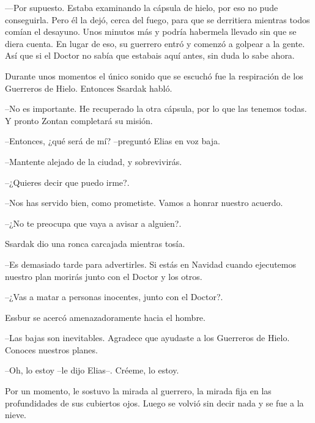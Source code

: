 —Por supuesto. Estaba examinando la cápsula de hielo, por eso no pude conseguirla. Pero él la dejó, cerca del fuego, para que se derritiera mientras todos comían el desayuno. Unos minutos más y podría habermela llevado sin que se diera cuenta. En lugar de eso, su guerrero entró y comenzó a golpear a la gente. Así que si el Doctor no sabía que estabais aquí antes, sin duda lo sabe ahora.



Durante unos momentos el único sonido que se escuchó fue la respiración de los Guerreros de Hielo. Entonces Ssardak habló.


--No es importante. He recuperado la otra cápsula, por lo que las tenemos todas. Y pronto Zontan completará su misión.



--Entonces, ¿qué será de mí? --preguntó Elias en voz baja.



--Mantente alejado de la ciudad, y sobrevivirás. 



--¿Quieres decir que puedo irme?.



--Nos has servido bien, como prometiste. Vamos a honrar nuestro acuerdo.



--¿No te preocupa que vaya a avisar a alguien?.



Ssardak dio una ronca carcajada mientras tosía. 

--Es demasiado tarde para advertirles. Si estás en Navidad cuando ejecutemos nuestro plan morirás junto con el Doctor y los otros.


--¿Vas a matar a personas inocentes, junto con el Doctor?.



Essbur se acercó amenazadoramente hacia el hombre. 


--Las bajas son inevitables. Agradece que ayudaste a los Guerreros de Hielo. Conoces nuestros planes.



--Oh, lo estoy --le dijo Elias--. Créeme, lo estoy.



Por un momento, le sostuvo la mirada al guerrero, la mirada fija en las profundidades de sus cubiertos ojos. Luego se volvió sin decir nada y se fue a la nieve.



\mbox{}



